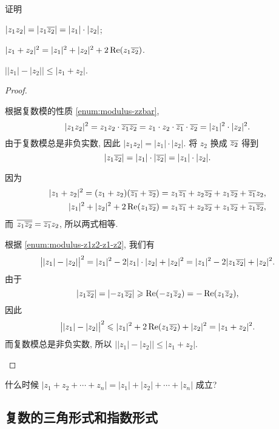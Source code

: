 \begin{example}
  证明\delspace
  \begin{enumnopar}[(i)]
    \item $|z_1z_2|=|z_1\overline{z_2}|=|z_1|\cdot|z_2|$;
    \label{enum:modulus-z1z2-z1-z2}
    \item $|z_1+z_2|^2=|z_1|^2+|z_2|^2+2\operatorname{Re}(z_1\overline{z_2})$.
    \item $\bigl||z_1|-|z_2|\bigr|\le|z_1+z_2|$.
  \end{enumnopar}
\end{example}

\begin{proof}\delspace
  \begin{enumnopar}[(i)]
    \item 根据复数模的性质 \ref{enum:modulus-zzbar},
    \[|z_1z_2|^2=z_1z_2\cdot\overline{z_1}\overline{z_2}
    =z_1\cdot z_2\cdot \overline{z_1}\cdot \overline{z_2}=|z_1|^2\cdot|z_2|^2.\]
    由于复数模总是非负实数, 因此 $|z_1z_2|=|z_1|\cdot|z_2|$.
    将 $z_2$ 换成 $\overline{z_2}$ 得到
    \[|z_1\overline{z_2}|=|z_1|\cdot|\overline{z_2}|=|z_1|\cdot|z_2|.\]
    \item 因为
    \begin{align*}
        |z_1+z_2|^2
       =(z_1+z_2)(\overline{z_1}+\overline{z_2})
      &=z_1\overline{z_1}+z_2\overline{z_2}+z_1\overline{z_2}+\overline{z_1}z_2,\\
        |z_1|^2+|z_2|^2+2\operatorname{Re}(z_1\overline{z_2})
      &=z_1\overline{z_1}+z_2\overline{z_2}+z_1\overline{z_2}+\overline{z_1\overline{z_2}},
    \end{align*}
    而 $\overline{z_1\overline{z_2}}=\overline{z_1}z_2$, 所以两式相等.
    \item 根据 \ref{enum:modulus-z1z2-z1-z2}, 我们有
      \[\bigl||z_1|-|z_2|\bigr|^2=|z_1|^2-2|z_1|\cdot|z_2|+|z_2|^2=|z_1|^2-2|z_1 \overline{z_2}|+|z_2|^2.\]
      由于
      \[|z_1\overline{z_2}|=|{-z_1\overline{z_2}}|\geqslant\operatorname{Re}(-z_1\overline z_2)=-\operatorname{Re}(z_1\overline z_2),\]
      因此
      \[\bigl||z_1|-|z_2|\bigr|^2\leqslant |z_1|^2+2\operatorname{Re}(z_1 \overline{z_2})+|z_2|^2=|z_1+z_2|^2.\]
      而复数模总是非负实数, 所以 $\bigl||z_1|-|z_2|\bigr|\le|z_1+z_2|$.
  \end{enumnopar}
\end{proof}

\begin{exercise}
  什么时候 $|z_1+z_2+\cdots+z_n|=|z_1|+|z_2|+\cdots+|z_n|$ 成立?
\end{exercise}



\subsection{复数的三角形式和指数形式}

